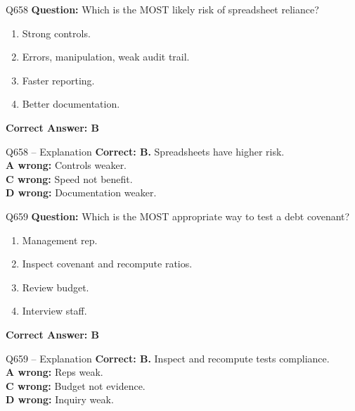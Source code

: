 \documentclass[aspectratio=169,10pt]{beamer}
\begin{document}
	\begin{frame}[t]{Q658}
		\small
		\textbf{Question:} Which is the MOST likely risk of spreadsheet reliance?
		\begin{enumerate}[label=\Alph*.,itemsep=1pt,topsep=2pt]
			\item Strong controls.
			\item Errors, manipulation, weak audit trail.
			\item Faster reporting.
			\item Better documentation.
		\end{enumerate}
		\vspace{4pt}
		\textbf{Correct Answer: B}
	\end{frame}
	
	\begin{frame}[t]{Q658 -- Explanation}
		\small
		\textbf{Correct: B.} Spreadsheets have higher risk. \\[4pt]
		\textbf{A wrong:} Controls weaker. \\[2pt]
		\textbf{C wrong:} Speed not benefit. \\[2pt]
		\textbf{D wrong:} Documentation weaker.
	\end{frame}
	
	\begin{frame}[t]{Q659}
		\small
		\textbf{Question:} Which is the MOST appropriate way to test a debt covenant?
		\begin{enumerate}[label=\Alph*.,itemsep=1pt,topsep=2pt]
			\item Management rep.
			\item Inspect covenant and recompute ratios.
			\item Review budget.
			\item Interview staff.
		\end{enumerate}
		\vspace{4pt}
		\textbf{Correct Answer: B}
	\end{frame}
	
	\begin{frame}[t]{Q659 -- Explanation}
		\small
		\textbf{Correct: B.} Inspect and recompute tests compliance. \\[4pt]
		\textbf{A wrong:} Reps weak. \\[2pt]
		\textbf{C wrong:} Budget not evidence. \\[2pt]
		\textbf{D wrong:} Inquiry weak.
	\end{frame}
	
\end{document}
